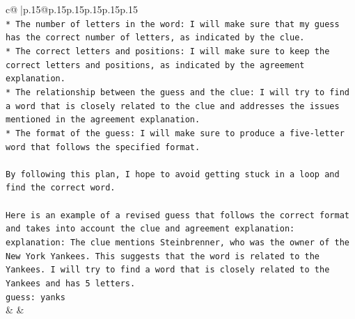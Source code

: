 \documentclass{article}
\begin{document}
{\begin{supertabular}{c@{$\;$}|p{.15\linewidth}@{}p{.15\linewidth}p{.15\linewidth}p{.15\linewidth}p{.15\linewidth}p{.15\linewidth}}
{{{\\ 
\texttt{* The number of letters in the word: I will make sure that my guess has the correct number of letters, as indicated by the clue.} \\
\texttt{* The correct letters and positions: I will make sure to keep the correct letters and positions, as indicated by the agreement explanation.} \\
\texttt{* The relationship between the guess and the clue: I will try to find a word that is closely related to the clue and addresses the issues mentioned in the agreement explanation.} \\
\texttt{* The format of the guess: I will make sure to produce a five{-}letter word that follows the specified format.} \\
\\ 
\texttt{By following this plan, I hope to avoid getting stuck in a loop and find the correct word.} \\
\\ 
\texttt{Here is an example of a revised guess that follows the correct format and takes into account the clue and agreement explanation:} \\
\texttt{explanation: The clue mentions Steinbrenner, who was the owner of the New York Yankees. This suggests that the word is related to the Yankees. I will try to find a word that is closely related to the Yankees and has 5 letters.} \\
\texttt{guess: yanks} \\
            }
        }
    }
    & & \\ \\

\end{supertabular}
}
\end{document}
